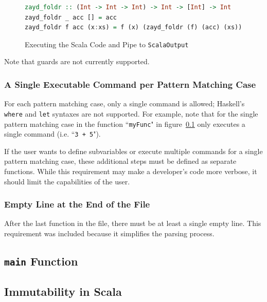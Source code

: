 \documentclass{report}
\begin{document}
\begin{tiny}
\begin{figure}[H]
\begin{mdframed}
\begin{lstlisting}[basicstyle=\small, language=Haskell]
zayd_foldr :: (Int -> Int -> Int) -> Int -> [Int] -> Int
zayd_foldr _ acc [] = acc
zayd_foldr f acc (x:xs) = f (x) (zayd_foldr (f) (acc) (xs))
\end{lstlisting}
\end{mdframed}
\caption{Executing the Scala Code and Pipe to \texttt{ScalaOutput}}\label{fig:functionZaydFoldr}
\end{figure}
\end{tiny}

Note that guards are not currently supported.

\subsubsection{A Single Executable Command per Pattern Matching Case}

For each pattern matching case, only a single command is allowed; Haskell's \texttt{where} and \texttt{let} syntaxes are not supported.  For example, note that for the single pattern matching case in the function ``\texttt{myFunc}" in figure~\ref{} only executes a single command (i.e. ``\texttt{3 + 5}").

If the user wants to define subvariables or execute multiple commands for a single pattern matching case, these additional steps must be defined as separate functions.  While this requirement may make a developer's code more verbose, it should limit the capabilities of the user.

\subsubsection{Empty Line at the End of the File}

After the last function in the file, there must be at least a single empty line.  This requirement was included because it simplifies the parsing process.

\subsection{\texttt{main} Function}




\subsection{Immutability in Scala}\label{sec:immutabilityScala}
\end{document}
